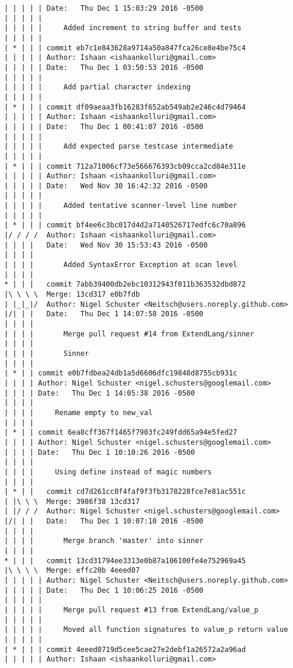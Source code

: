 \begin{lstlisting}
| | | | | Date:   Thu Dec 1 15:03:29 2016 -0500
| | | | | 
| | | | |     Added increment to string buffer and tests
| | | | |      
| * | | | commit eb7c1e843628a9714a50a847fca26ce8e4be75c4
| | | | | Author: Ishaan <ishaankolluri@gmail.com>
| | | | | Date:   Thu Dec 1 03:50:53 2016 -0500
| | | | | 
| | | | |     Add partial character indexing
| | | | |      
| * | | | commit df09aeaa3fb16283f652ab549ab2e246c4d79464
| | | | | Author: Ishaan <ishaankolluri@gmail.com>
| | | | | Date:   Thu Dec 1 00:41:07 2016 -0500
| | | | | 
| | | | |     Add expected parse testcase intermediate
| | | | |      
| * | | | commit 712a71006cf73e566676393cb09cca2cd84e311e
| | | | | Author: Ishaan <ishaankolluri@gmail.com>
| | | | | Date:   Wed Nov 30 16:42:32 2016 -0500
| | | | | 
| | | | |     Added tentative scanner-level line number
| | | | |      
| * | | | commit bf4ee6c3bc017d4d2a7140526717edfc6c70a896
|/ / / /  Author: Ishaan <ishaankolluri@gmail.com>
| | | |   Date:   Wed Nov 30 15:53:43 2016 -0500
| | | |   
| | | |       Added SyntaxError Exception at scan level
| | | |       
* | | |   commit 7abb39400db2ebc10312943f011b363532dbd872
|\ \ \ \  Merge: 13cd317 e0b7fdb
| |_|_|/  Author: Nigel Schuster <Neitsch@users.noreply.github.com>
|/| | |   Date:   Thu Dec 1 14:07:58 2016 -0500
| | | |   
| | | |       Merge pull request #14 from ExtendLang/sinner
| | | |       
| | | |       Sinner
| | | |     
| * | | commit e0b7fdbea24db1a5d6606dfc19848d8755cb931c
| | | | Author: Nigel Schuster <nigel.schusters@googlemail.com>
| | | | Date:   Thu Dec 1 14:05:38 2016 -0500
| | | | 
| | | |     Rename empty to new_val
| | | |     
| * | | commit 6ea8cff367f1465f7903fc249fdd65a94e5fed27
| | | | Author: Nigel Schuster <nigel.schusters@googlemail.com>
| | | | Date:   Thu Dec 1 10:10:26 2016 -0500
| | | | 
| | | |     Using define instead of magic numbers
| | | |       
| * | |   commit cd7d261cc0f4faf9f3fb3178228fce7e81ac551c
| |\ \ \  Merge: 3986f38 13cd317
| |/ / /  Author: Nigel Schuster <nigel.schusters@googlemail.com>
|/| | |   Date:   Thu Dec 1 10:07:10 2016 -0500
| | | |   
| | | |       Merge branch 'master' into sinner
| | | |       
* | | |   commit 13cd31794ee3313e0b87a106100fe4e752969a45
|\ \ \ \  Merge: effc20b 4eeed07
| | | | | Author: Nigel Schuster <Neitsch@users.noreply.github.com>
| | | | | Date:   Thu Dec 1 10:06:25 2016 -0500
| | | | | 
| | | | |     Merge pull request #13 from ExtendLang/value_p
| | | | |     
| | | | |     Moved all function signatures to value_p return value
| | | | |      
| * | | | commit 4eeed0719d5cee5cae27e2debf1a26572a2a96ad
| | | | | Author: Ishaan <ishaankolluri@gmail.com>

\end{lstlisting}
